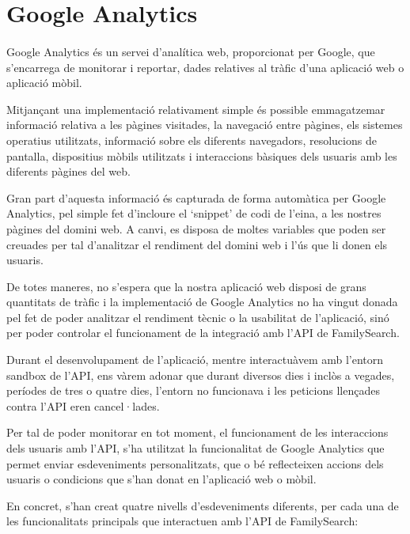 \section{Google Analytics}

    \paragraph{}
    Google Analytics és un servei d'analítica web, proporcionat per Google, que s'en\-ca\-rre\-ga de monitorar i reportar, dades relatives al tràfic d'una aplicació web o aplicació mòbil.

    Mitjançant una implementació relativament simple és possible emmagatzemar informació relativa a les pàgines visitades, la navegació entre pàgines, els sistemes ope\-ra\-tius utilitzats, informació sobre els diferents navegadors, resolucions de pantalla, dispositius mòbils utilitzats i interaccions bàsiques dels usuaris amb les diferents pàgines del web.

    Gran part d'aquesta informació és capturada de forma automàtica per Google Analytics, pel simple fet d'incloure el `snippet' de codi de l'eina, a les nostres pàgines del domini web. A canvi, es disposa de moltes variables que poden ser creuades per tal d'analitzar el rendiment del domini web i l'ús que li donen els usuaris.

    De totes maneres, no s'espera que la nostra aplicació web disposi de grans quantitats de tràfic i la implementació de Google Analytics no ha vingut donada pel fet de poder analitzar el rendiment tècnic o la usabilitat de l'aplicació, sinó per poder controlar el funcionament de la integració amb l'API de FamilySearch.

    Durant el desenvolupament de l'aplicació, mentre interactuàvem amb l'entorn sandbox de l'API, ens vàrem adonar que durant diversos dies i inclòs a vegades, períodes de tres o quatre dies, l'entorn no funcionava i les peticions llençades contra l'API eren cancel·lades.

    Per tal de poder monitorar en tot moment, el funcionament de les interaccions dels usuaris amb l'API, s'ha utilitzat la funcionalitat de Google Analytics que permet enviar esdeveniments personalitzats, que o bé reflecteixen accions dels usuaris o condicions que s'han donat en l'aplicació web o mòbil.

    En concret, s'han creat quatre nivells d'esdeveniments diferents, per cada una de les funcionalitats principals que interactuen amb l'API de FamilySearch:

